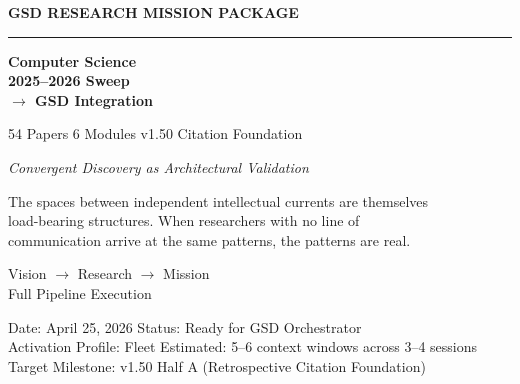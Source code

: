 \documentclass[11pt,letterpaper]{article}
\begin{document}
\thispagestyle{empty}
\begin{center}
\vspace*{2.5cm}

{\small\sffamily\textcolor{primary}{\textbf{GSD RESEARCH MISSION PACKAGE}}}

\vspace{0.3cm}
\textcolor{bordergray}{\rule{8cm}{0.4pt}}

\vspace{1.5cm}
{\fontsize{26}{32}\selectfont\bfseries\sffamily\textcolor{primary}{Computer Science\\[0.2em]2025--2026 Sweep\\[0.5em]\large $\rightarrow$ GSD Integration}}

\vspace{0.8cm}
{\Large\sffamily\textcolor{secondary}{54 Papers \textbar{} 6 Modules \textbar{} v1.50 Citation Foundation}}

\vspace{0.5cm}
{\large\sffamily\itshape\textcolor{tertiary}{Convergent Discovery as Architectural Validation}}

\vspace{2cm}
\begin{quotebox}
\centering\small\sffamily
The spaces between independent intellectual currents are themselves\\
load-bearing structures. When researchers with no line of\\
communication arrive at the same patterns, the patterns are real.
\end{quotebox}

\vspace{2cm}
{\sffamily\textcolor{accent}{Vision $\rightarrow$ Research $\rightarrow$ Mission}}\\[0.3em]
{\small\sffamily\textcolor{accent}{Full Pipeline Execution}}

\vspace{2cm}
{\small\sffamily\textcolor{subtlegray}{Date: April 25, 2026 \textbar{} Status: Ready for GSD Orchestrator}}\\[0.3em]
{\small\sffamily\textcolor{subtlegray}{Activation Profile: Fleet \textbar{} Estimated: 5--6 context windows across 3--4 sessions}}\\[0.3em]
{\small\sffamily\textcolor{subtlegray}{Target Milestone: v1.50 Half A (Retrospective Citation Foundation)}}
\end{center}
\newpage
\end{document}
